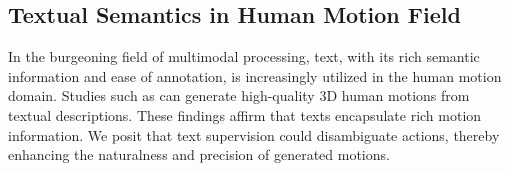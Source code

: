 \documentclass[letterpaper]{article} %
\begin{document}
\subsection{Textual Semantics in Human Motion Field}
In the burgeoning field of multimodal processing, text, with its rich semantic information and ease of annotation, is increasingly utilized in the human motion domain. Studies such as \cite{guo2022generating,zhang2022motiondiffuse,tevet2022motionclip} can generate high-quality 3D human motions from textual descriptions. 
These findings affirm that texts encapsulate rich motion information. We posit that text supervision could disambiguate actions, thereby enhancing the naturalness and precision of generated motions.

\end{document}
